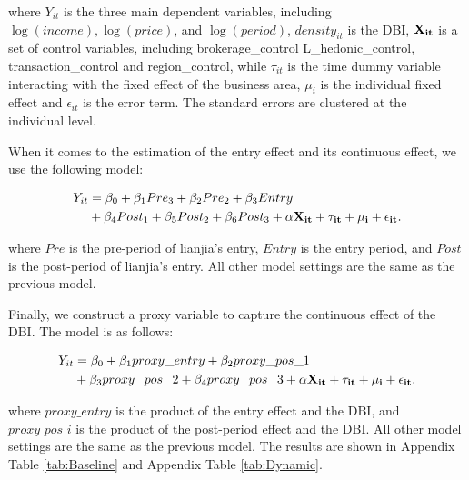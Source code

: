 \documentclass[12pt]{article}
\begin{document}
where $Y_{it}$ is the three main dependent variables, including $\log(income), \log(price)$, and $\log(period)$, $density_{it}$ is the DBI, $\bf{X}_{it}$ is a set of control variables, including brokerage\_control L\_hedonic\_control, transaction\_control and region\_control, while $\tau_{it}$ is the time dummy variable interacting with the fixed effect of the business area, $\mu_i$ is the individual fixed effect and $\epsilon_{it}$ is the error term. The standard errors are clustered at the individual level.

When it comes to the estimation of the entry effect and its continuous effect, we use the following model:

\begin{equation}
  \begin{aligned}
    Y_{it} & = \beta_0 + \beta_1 Pre_3 + \beta_2 Pre_2 + \beta_3 Entry \\
    & + \beta_4 Post_1 + \beta_5 Post_2 + \beta_6 Post_3  + \bf{\alpha} \bf{X}_{it} + \tau_{it} + \mu_i + \epsilon_{it}.
  \end{aligned}
\end{equation}

where $Pre$ is the pre-period of lianjia's entry, $Entry$ is the entry period, and $Post$ is the post-period of lianjia's entry. All other model settings are the same as the previous model.

Finally, we construct a proxy variable to capture the continuous effect of the DBI. The model is as follows:

\begin{equation}
  \begin{aligned}
    Y_{it} & = \beta_0 + \beta_1 proxy\_entry + \beta_2 proxy\_pos\_1 \\
    & + \beta_3 proxy\_pos\_2 + \beta_4 proxy\_pos\_3 + \bf{\alpha} \bf{X}_{it} + \tau_{it} + \mu_i + \epsilon_{it}.
  \end{aligned}
\end{equation}

where $proxy\_entry$ is the product of the entry effect and the DBI, and $proxy\_pos\_i$ is the product of the post-period effect and the DBI. All other model settings are the same as the previous model. The results are shown in Appendix Table \ref{tab:Baseline} and Appendix Table \ref{tab:Dynamic}.
\end{document}
